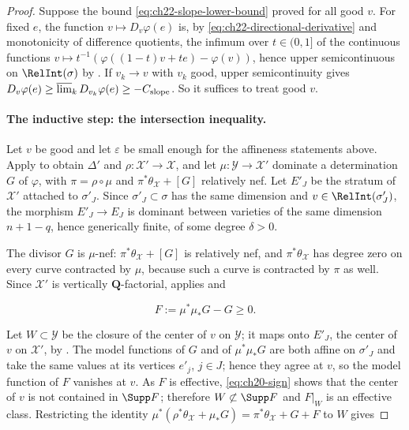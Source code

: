 \begin{proof}
Suppose the bound \eqref{eq:ch22-slope-lower-bound} proved for all good
\(v\).  For fixed \(e\), the function
\(v\mapsto D_v\varphi(e)\) is, by
\eqref{eq:ch22-directional-derivative} and monotonicity of difference
quotients, the infimum over \(t\in(0,1]\) of the continuous functions
\(v\mapsto t^{-1}(\varphi((1-t)v+te)-\varphi(v))\), hence upper
semicontinuous on \(\RelInt(\sigma)\) by
.  If \(v_k\to v\) with \(v_k\) good, upper
semicontinuity gives
\(D_v\varphi(e)\geq\varlimsup_kD_{v_k}\varphi(e)\geq-C_{\mathrm{slope}}\).
So it suffices to treat good \(v\).

\paragraph{The inductive step: the intersection inequality.}
Let \(v\) be good and let \(\varepsilon\) be small enough for the affineness
statements above.  Apply  to obtain
\(\Delta'\) and \(\rho:\mathcal X'\to\mathcal X\), and let
\(\mu:\mathcal Y\to\mathcal X'\) dominate a determination \(G\) of
\(\varphi\), with \(\pi=\rho\circ\mu\) and \(\pi^*\theta_{\mathcal X}+[G]\)
relatively nef.  Let \(E'_J\) be the stratum of \(\mathcal X'\) attached to
\(\sigma'_J\).  Since \(\sigma'_J\subset\sigma\) has the same dimension and
\(v\in\RelInt(\sigma'_J)\), the morphism \(E'_J\to E_J\) is dominant between
varieties of the same dimension \(n+1-q\), hence generically finite, of some
degree \(\delta>0\).

The divisor \(G\) is \(\mu\)-nef: \(\pi^*\theta_{\mathcal X}+[G]\) is
relatively nef, and \(\pi^*\theta_{\mathcal X}\) has degree zero on every
curve contracted by \(\mu\), because such a curve is contracted by
\(\pi\) as well.  Since \(\mathcal X'\) is vertically
\(\mathbf Q\)-factorial,  applies and

\[
 F:=\mu^*\mu_*G-G\geq0 .
\tag{22.45}\label{eq:ch22-negativity-application}
\]

Let \(W\subset\mathcal Y\) be the closure of the center of \(v\) on
\(\mathcal Y\); it maps onto \(E'_J\), the center of \(v\) on
\(\mathcal X'\), by .  The model
functions of \(G\) and of \(\mu^*\mu_*G\) are both affine on \(\sigma'_J\)
and take the same values at its vertices \(e'_j\), \(j\in J\); hence they
agree at \(v\), so the model function of \(F\) vanishes at \(v\).  As \(F\)
is effective, \eqref{eq:ch20-sign} shows that the center of \(v\) is not
contained in \(\Supp F\); therefore \(W\not\subset\Supp F\) and \(F|_W\) is
an effective class.  Restricting the identity
\(\mu^*(\rho^*\theta_{\mathcal X}+\mu_*G)
=\pi^*\theta_{\mathcal X}+G+F\) to \(W\) gives


\end{proof}
